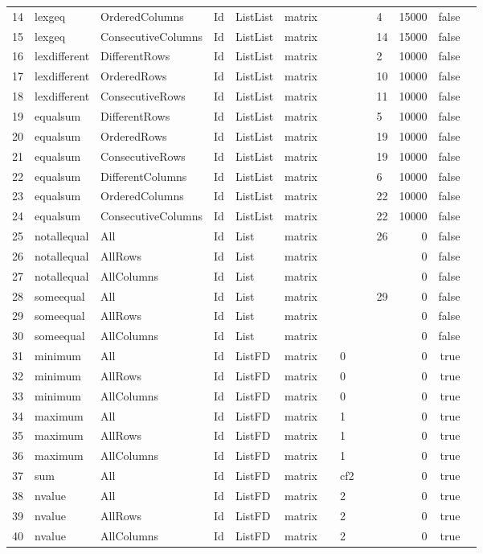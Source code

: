 \begin{frame}
{\begin{tabular}{llllllllllrrl}
\rowcolor{black!5}14&lexgeq&OrderedColumns&Id&ListList&matrix&&&&4&15000&false&\\ 
\rowcolor{black!5}15&lexgeq&ConsecutiveColumns&Id&ListList&matrix&&&&14&15000&false&\\ 
\rowcolor{black!5}16&lexdifferent&DifferentRows&Id&ListList&matrix&&&&2&10000&false&\\ 
\rowcolor{black!5}17&lexdifferent&OrderedRows&Id&ListList&matrix&&&&10&10000&false&\\ 
\rowcolor{black!5}18&lexdifferent&ConsecutiveRows&Id&ListList&matrix&&&&11&10000&false&\\ 
\rowcolor{black!5}19&equalsum&DifferentRows&Id&ListList&matrix&&&&5&10000&false&\\ 
\rowcolor{black!5}20&equalsum&OrderedRows&Id&ListList&matrix&&&&19&10000&false&\\ 
\rowcolor{black!5}21&equalsum&ConsecutiveRows&Id&ListList&matrix&&&&19&10000&false&\\ 
\rowcolor{black!5}22&equalsum&DifferentColumns&Id&ListList&matrix&&&&6&10000&false&\\ 
\rowcolor{black!5}23&equalsum&OrderedColumns&Id&ListList&matrix&&&&22&10000&false&\\ 
\rowcolor{black!5}24&equalsum&ConsecutiveColumns&Id&ListList&matrix&&&&22&10000&false&\\ 
\rowcolor{black!5}25&notallequal&All&Id&List&matrix&&&&26&0&false&\\ 
\rowcolor{brown!5}26&notallequal&AllRows&Id&List&matrix&&&&&0&false&\\ 
\rowcolor{brown!5}27&notallequal&AllColumns&Id&List&matrix&&&&&0&false&\\ 
\rowcolor{black!5}28&someequal&All&Id&List&matrix&&&&29&0&false&\\ 
\rowcolor{brown!5}29&someequal&AllRows&Id&List&matrix&&&&&0&false&\\ 
\rowcolor{brown!5}30&someequal&AllColumns&Id&List&matrix&&&&&0&false&\\ 
\rowcolor{brown!5}31&minimum&All&Id&ListFD&matrix&&0&&&0&true&\\ 
\rowcolor{brown!5}32&minimum&AllRows&Id&ListFD&matrix&&0&&&0&true&\\ 
\rowcolor{brown!5}33&minimum&AllColumns&Id&ListFD&matrix&&0&&&0&true&\\ 
\rowcolor{brown!5}34&maximum&All&Id&ListFD&matrix&&1&&&0&true&\\ 
\rowcolor{brown!5}35&maximum&AllRows&Id&ListFD&matrix&&1&&&0&true&\\ 
\rowcolor{brown!5}36&maximum&AllColumns&Id&ListFD&matrix&&1&&&0&true&\\ 
\rowcolor{brown!5}37&sum&All&Id&ListFD&matrix&&cf2&&&0&true&\\ 
\rowcolor{brown!5}38&nvalue&All&Id&ListFD&matrix&&2&&&0&true&\\ 
\rowcolor{brown!5}39&nvalue&AllRows&Id&ListFD&matrix&&2&&&0&true&\\ 
\rowcolor{brown!5}40&nvalue&AllColumns&Id&ListFD&matrix&&2&&&0&true&\\ 
\bottomrule
\end{tabular}
}

\end{frame}

